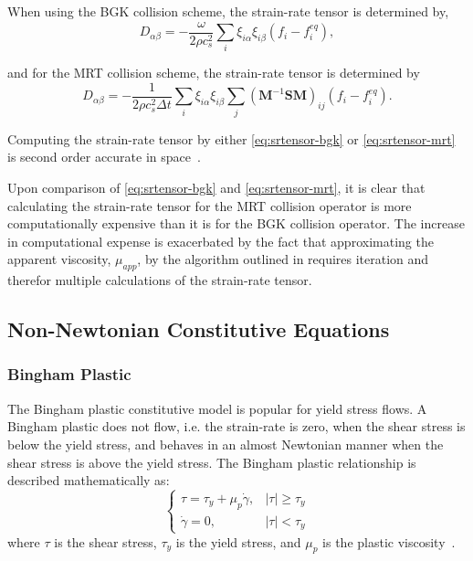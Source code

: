 \documentclass[pdftex,ms]{pittetd}
\newcommand{\transM}{\mathbf{M}}
\newcommand{\relaxM}{\mathbf{S}}
\begin{document}
\noindent When using the BGK collision scheme, the strain-rate tensor is determined by,
\begin{equation} \label{eq:srtensor-bgk}
D_{\alpha \beta} = -\frac{\omega}{2 \rho c_s^2} \sum_i \xi_{i \alpha} \xi_{i \beta} (f_i - f^{eq}_i),
\end{equation} %

\noindent and for the MRT collision scheme, the strain-rate tensor is determined by
\begin{equation} \label{eq:srtensor-mrt}
D_{\alpha \beta} = -\frac{1}{2 \rho c_s^2 \Delta t} \sum_i \xi_{i \alpha} \xi_{i \beta} \sum_j (\transM^{-1} \relaxM \transM)_{ij}(f_i - f^{eq}_i).
\end{equation} %

\noindent Computing the strain-rate tensor by either \eqref{eq:srtensor-bgk} or \eqref{eq:srtensor-mrt} is second order accurate in space~\cite{kruger2009shear,kruger2010second}.

Upon comparison of \eqref{eq:srtensor-bgk} and \eqref{eq:srtensor-mrt}, it is clear that calculating the strain-rate tensor for the MRT collision operator is more computationally expensive than it is for the BGK collision operator.
The increase in computational expense is exacerbated by the fact that approximating the apparent viscosity, $\mu_{app}$, by the algorithm outlined in  requires iteration and therefor multiple calculations of the strain-rate tensor.

\subsection{Non-Newtonian Constitutive Equations}

\subsubsection{Bingham Plastic} \label{sec:bp}

The Bingham plastic constitutive model is popular for yield stress flows.
A Bingham plastic does not flow, i.e. the strain-rate is zero, when the shear stress is below the yield stress, and behaves in an almost Newtonian manner when the shear stress is above the yield stress.
The Bingham plastic relationship is described mathematically as:
\begin{equation} \label{eq:bingham}
\begin{cases}
\tau = \tau_y + \mu_p \dot{\gamma}, & |\tau| \geq \tau_y \\
\dot{\gamma} = 0, & |\tau| < \tau_y
\end{cases}
\end{equation}
\noindent where $\tau$ is the shear stress, $\tau_y$ is the yield stress, and $\mu_p$ is the plastic viscosity~\cite{bingham1922fluidity}.
\end{document}
